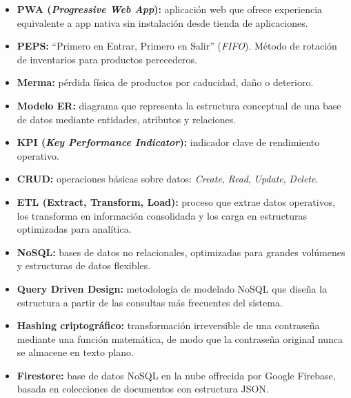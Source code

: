 \documentclass[journal]{IEEEtran}
\begin{document}
	\begin{itemize}[leftmargin=*, label=\textbullet, itemsep=2pt]
		\item \textbf{PWA (\textit{Progressive Web App}):} aplicaci\'{o}n
		web que ofrece experiencia equivalente a app nativa sin
		instalaci\'{o}n desde tienda de aplicaciones.
		
		\item \textbf{PEPS:} ``Primero en Entrar, Primero en Salir''
		(\textit{FIFO}). M\'{e}todo de rotaci\'{o}n de inventarios
		para productos perecederos.
		
		\item \textbf{Merma:} p\'{e}rdida f\'{i}sica de productos por
		caducidad, da\~{n}o o deterioro.
		
		\item \textbf{Modelo ER:} diagrama que representa la estructura
		conceptual de una base de datos mediante entidades,
		atributos y relaciones.
		
		\item \textbf{KPI (\textit{Key Performance Indicator}):}
		indicador clave de rendimiento operativo.
		
		\item \textbf{CRUD:} operaciones b\'{a}sicas sobre datos:
		\textit{Create}, \textit{Read}, \textit{Update},
		\textit{Delete}.
		
		\item \textbf{ETL (Extract, Transform, Load):} proceso que
		extrae datos operativos, los transforma en informaci\'{o}n
		consolidada y los carga en estructuras optimizadas
		para anal\'{i}tica.
		
		\item \textbf{NoSQL:} bases de datos no relacionales, optimizadas
		para grandes vol\'{u}menes y estructuras de datos flexibles.
		
		\item \textbf{Query Driven Design:} metodolog\'{i}a de modelado
		NoSQL que dise\~{n}a la estructura a partir de las
		consultas m\'{a}s frecuentes del sistema.
		
		\item \textbf{Hashing criptogr\'{a}fico:} transformaci\'{o}n
		irreversible de una contrase\~{n}a mediante una funci\'{o}n
		matem\'{a}tica, de modo que la contrase\~{n}a original
		nunca se almacene en texto plano.
		
		\item \textbf{Firestore:} base de datos NoSQL en la nube
		offrecida por Google Firebase, basada en colecciones de
		documentos con estructura JSON.
		

\end{itemize}
\end{document}
